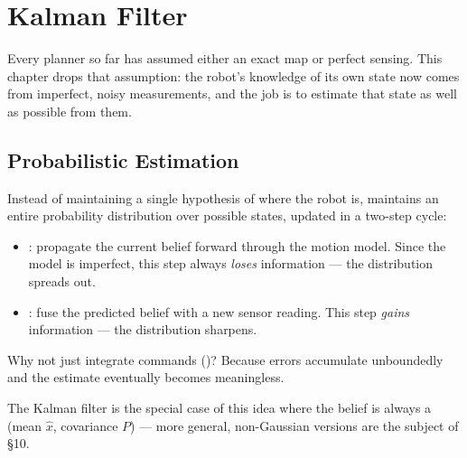 \section{Kalman Filter}
Every planner so far has assumed either an exact map or perfect sensing. This chapter drops that assumption: the robot's knowledge of its own state now comes from imperfect, noisy measurements, and the job is to estimate that state as well as possible from them.

\subsection{Probabilistic Estimation}
Instead of maintaining a single hypothesis of where the robot is,  maintains an entire probability distribution over possible states, updated in a two-step cycle:
\begin{itemize}
\item {}: propagate the current belief forward through the motion model. Since the model is imperfect, this step always \emph{loses} information --- the distribution spreads out.
\item {}: fuse the predicted belief with a new sensor reading. This step \emph{gains} information --- the distribution sharpens.
\end{itemize}
\begin{notebox}
Why not just integrate commands ()? Because errors accumulate unboundedly and the estimate eventually becomes meaningless.
\end{notebox}


The Kalman filter is the special case of this idea where the belief is always a  (mean $\hat x$, covariance $P$) --- more general, non-Gaussian versions are the subject of \S10.

